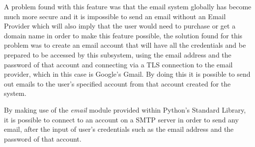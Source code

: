 A problem found with this feature was that the email system globally has become
much more secure and it is impossible to send an email without an Email Provider
which will also imply that the user would need to purchase or get a domain name
in order to make this feature possible, the solution found for this problem was
to create an email account that will have all the credentials and be prepared to
be accessed by this subsystem, using the email address and the password of that
account and connecting via a TLS connection to the email provider, which in this
case is Google's Gmail. By doing this it is possible to send out emails to the
user's specified account from that account created for the system.

By making use of the \emph{email} module provided within Python's Standard
Library, it is possible to connect to an account on a SMTP server in order to
send any email, after the input of user's credentials such as the email address
and the password of that account.





